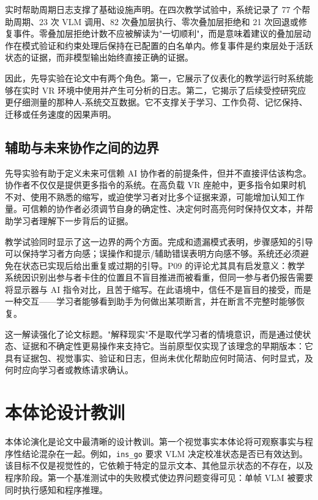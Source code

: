实时帮助周期日志支撑了基础设施声明。在四次教学试验中，系统记录了 77 个帮助周期、23 次 VLM 调用、82 次叠加层执行、零次叠加层拒绝和 21 次回退或修复事件。零叠加层拒绝计数不应被解读为"一切顺利"，而是意味着建议的叠加层动作在模式验证和约束处理后保持在已配置的白名单内。修复事件是约束层处于活跃状态的证据，而非模型输出始终直接正确的证据。

因此，先导实验在论文中有两个角色。第一，它展示了仪表化的教学运行时系统能够在实时 VR 环境中使用并产生可分析的日志。第二，它揭示了后续受控研究应更仔细测量的那种人-系统交互数据。它不支撑关于学习、工作负荷、记忆保持、迁移或任务速度的因果声明。

\subsection{辅助与未来协作之间的边界}

先导实验有助于定义未来可信赖 AI 协作者的前提条件，但并不直接评估该构念。协作者不仅仅是提供更多指令的系统。在高负载 VR 座舱中，更多指令如果时机不对、使用不熟悉的缩写，或迫使学习者对比多个证据来源，可能增加认知工作量。可信赖的协作者必须调节自身的确定性、决定何时高亮何时保持仅文本，并帮助学习者理解下一步背后的证据。

教学试验同时显示了这一边界的两个方面。完成和遗漏模式表明，步骤感知的引导可以保持学习者方向感；误操作和提示/辅助错误表明方向感不够。系统还必须避免在状态已实现后给出重复或过期的引导。P09 的评论尤其具有启发意义：教学系统因识别出参与者卡住的位置且不盲目推进而被看重，但同一参与者仍报告需要将显示器与 AI 指令对比，且苦于缩写。在此语境中，信任不是盲目的接受，而是一种交互——学习者能够看到助手为何做出某项断言，并在断言不完整时能够恢复。

这一解读强化了论文标题。"解释现实"不是取代学习者的情境意识，而是通过使状态、证据和不确定性更易操作来支持它。当前原型仅实现了该理念的早期版本：它具有证据包、视觉事实、验证和日志，但尚未优化帮助应何时简洁、何时显式，及何时应向学习者或教练请求确认。

\section{本体论设计教训}\label{sec:disc-ontology}

本体论演化是论文中最清晰的设计教训。第一个视觉事实本体论将可观察事实与程序性结论混杂在一起。例如，\texttt{ins\_go} 要求 VLM 决定校准状态是否已有效达到。该目标不仅是视觉性的，它依赖于特定的显示文本、其他显示状态的不存在，以及程序阶段。第一个基准测试中的失败模式使边界问题变得可见：单帧 VLM 被要求同时执行感知和程序推理。

